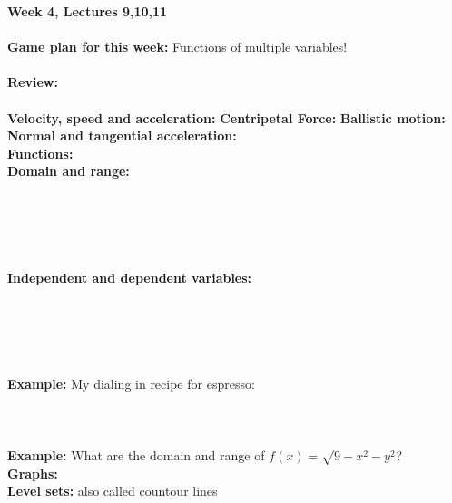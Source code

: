 \documentclass[11pt]{article}
\newcommand{\1}{\mathds{1}}
\theoremstyle{definition}
\theoremstyle{remark}
\newcommand{\dd}{\\ \\ \\ \noindent}
\newcommand{\dds}{\\ \\ \\ \\ \\ \\ \noindent}
\newcommand{\al}{\noindent}
\newcommand{\ex}{\al \textbf{Example:} }
\newcommand{\np}{\newpage \al}
\begin{document}
	
	\al \large \textbf{{Week 4, Lectures 9,10,11}}
	\\
	\\
	\textbf{Game plan for this week:} Functions of multiple variables!
	\\
	\\
	\textbf{Review:}
	\\
	\\
	\textbf{Velocity, speed and acceleration:}
	\textbf{Centripetal Force:}
	\textbf{Ballistic motion:}
	\textbf{Normal and tangential acceleration:}\\
	\newpage
	\al \textbf{Functions:}\\
	\textbf{Domain and range:}
	\dds
	\textbf{Independent and dependent variables:}
	\dds
	\ex My dialing in recipe for espresso:\\
	\dd
	\ex What are the domain and range of $f(x) = \sqrt{9 - x^2 - y^2}$?\\
	\np
	\textbf{Graphs:}\\
	\textbf{Level sets:} also called countour lines\\
\end{document}
